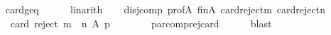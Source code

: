 \begin{isabellebody}
\ \ \ \ \isamarkupfalse%
\ card{\isacharunderscore}{\kern0pt}geq{\isacharunderscore}{\kern0pt}{}\isanewline
\ \ \ \ \isamarkupfalse%
\ linarith\isanewline
\ \ \isamarkupfalse%
\ disj{\isacharunderscore}{\kern0pt}comp\ prof{\isacharunderscore}{\kern0pt}A\ fin{\isacharunderscore}{\kern0pt}A\ card{\isacharunderscore}{\kern0pt}reject{\isacharunderscore}{\kern0pt}m\ card{\isacharunderscore}{\kern0pt}reject{\isacharunderscore}{\kern0pt}n\isanewline
\ \ \isamarkupfalse%
\isanewline
\ \ \ \ {\isachardoublequoteopen}card\ {\isacharparenleft}{\kern0pt}reject\ {\isacharparenleft}{\kern0pt}m\ {\isasymparallel}\isactrlsub {\isasymup}\ n{\isacharparenright}{\kern0pt}\ A\ p{\isacharparenright}{\kern0pt}\ {\isacharequal}{\kern0pt}\ {}{\isachardoublequoteclose}\isanewline
\ \ \ \ \isamarkupfalse%
\ par{\isacharunderscore}{\kern0pt}comp{\isacharunderscore}{\kern0pt}rej{\isacharunderscore}{\kern0pt}card\isanewline
\ \ \ \ \isamarkupfalse%
\ blast\isanewline
{}\isamarkupfalse%
%
\endisatagproof
{\isafoldproof}%
%
\isadelimproof
\isanewline
%
\endisadelimproof
%
\isadelimtheory
\isanewline
%
\endisadelimtheory
%
\isatagtheory
{}\isamarkupfalse%
%
\endisatagtheory
{\isafoldtheory}%
%
\isadelimtheory
%
\endisadelimtheory
%
\end{isabellebody}%
\endinput
